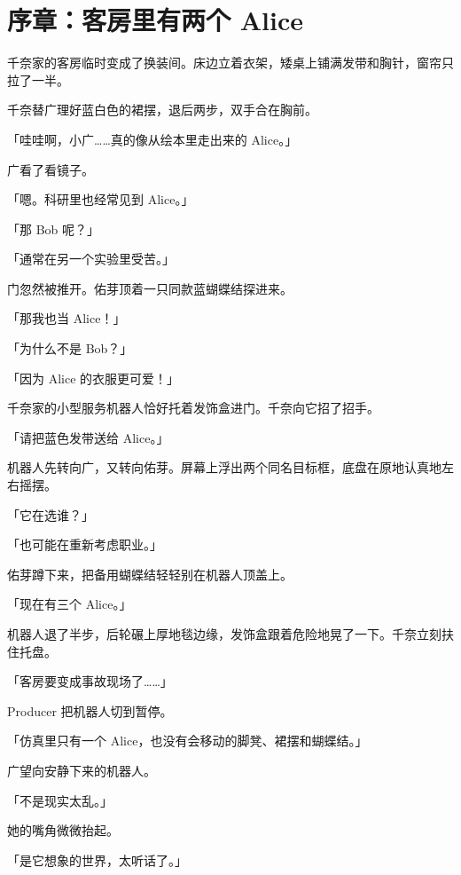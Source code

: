 

\section*{序章：客房里有两个 Alice}
{}

千奈家的客房临时变成了换装间。床边立着衣架，矮桌上铺满发带和胸针，窗帘只拉了一半。

千奈替广理好蓝白色的裙摆，退后两步，双手合在胸前。

「哇哇啊，小广……真的像从绘本里走出来的 Alice。」

广看了看镜子。

「嗯。科研里也经常见到 Alice。」

「那 Bob 呢？」

「通常在另一个实验里受苦。」

门忽然被推开。佑芽顶着一只同款蓝蝴蝶结探进来。

「那我也当 Alice！」

「为什么不是 Bob？」

「因为 Alice 的衣服更可爱！」

千奈家的小型服务机器人恰好托着发饰盒进门。千奈向它招了招手。

「请把蓝色发带送给 Alice。」

机器人先转向广，又转向佑芽。屏幕上浮出两个同名目标框，底盘在原地认真地左右摇摆。

「它在选谁？」

「也可能在重新考虑职业。」

佑芽蹲下来，把备用蝴蝶结轻轻别在机器人顶盖上。

「现在有三个 Alice。」

机器人退了半步，后轮碾上厚地毯边缘，发饰盒跟着危险地晃了一下。千奈立刻扶住托盘。

「客房要变成事故现场了……」

Producer 把机器人切到暂停。

「仿真里只有一个 Alice，也没有会移动的脚凳、裙摆和蝴蝶结。」

广望向安静下来的机器人。

「不是现实太乱。」

她的嘴角微微抬起。

「是它想象的世界，太听话了。」

\prologuedivider
\clearpage

